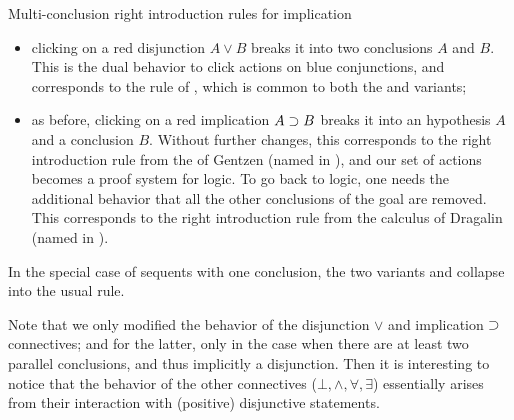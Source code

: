 \begin{marginfigure}
  \caption{Multi-conclusion right introduction rules for implication}
\end{marginfigure}

\begin{itemize}
  \item clicking on a red disjunction $A \lor B$ breaks it into two conclusions
  $A$ and $B$. This is the dual behavior to click actions on blue conjunctions,
  and corresponds to the {} rule of , which is
  common to both the  and  variants;
  \item as before, clicking on a red implication $A \supset B$ breaks it into an
  hypothesis $A$ and a conclusion $B$. Without further changes, this corresponds
  to the right introduction rule from the    of
  Gentzen (named {} in ), and
  our set of actions becomes a proof system for  logic. To go back to
   logic, one needs the additional behavior that all the other
  conclusions of the goal are removed. This corresponds to the right
  introduction rule from the  calculus of Dragalin (named
  {} in ).
\end{itemize}

\begin{remark}
  In the special case of  sequents with one conclusion, the two
  variants {} and {} collapse into the usual
  {} rule.
\end{remark}
Note that we only modified the behavior of the disjunction $\lor$ and
implication $\supset$ connectives; and for the latter, only in the case when there
are at least two parallel conclusions, and thus implicitly a disjunction. Then
it is interesting to notice that the  behavior of the other connectives
($\bot, \land, \forall, \exists$) essentially arises from their interaction with
(positive) disjunctive statements.

